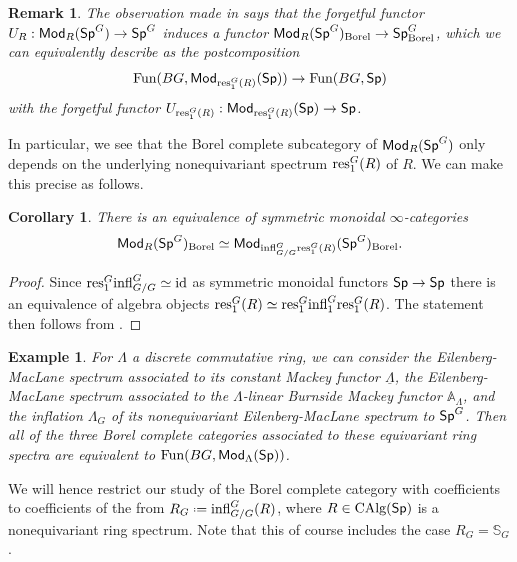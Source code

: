 \documentclass[reqno]{amsart}
\numberwithin{equation}{section}\theoremstyle{thms}
\newtheorem{cor}[equation]{Corollary}
\theoremstyle{defn}
\newtheorem{ex}[equation]{Example}
\newtheorem{rem}[equation]{Remark}
\newcommand{\bA}{\mathbb{A}}
\newcommand{\bS}{\mathbb{S}}
\newcommand{\tn}[1]{\textnormal{#1}}
\newcommand{\tsf}[1]{\textsf{\textup{#1}}}
\newcommand{\underl}[1]{\underline{#1}}
\newcommand*{\defeq}{\mathrel{\vcenter{\baselineskip0.4ex \lineskiplimit0pt
\hbox{\scriptsize.}\hbox{\scriptsize.}}}%
=}
\newcommand{\fun}{\tn{Fun}}
\newcommand{\calg}{\tn{CAlg}}
\newcommand{\Mod}{\tsf{Mod}}
\newcommand{\spec}{\tsf{Sp}}
\newcommand{\specg}{\tsf{Sp}^G}
\begin{document}
\begin{rem}\label{rem:forgetfulonborelcompletes}
The observation made in  says that the forgetful functor $U_R: \Mod_R(\specg) \to \specg$ induces a functor $\Mod_R(\specg)_{\tn{Borel}} \to \specg_{\tn{Borel}}$, which we can equivalently describe as the postcomposition
$$\fun(BG,\Mod_{\tn{res}^G_1(R)}(\spec)) \to \fun(BG,\spec)$$
with the forgetful functor $U_{\tn{res}^G_1(R)}: \Mod_{\tn{res}^G_1(R)}(\spec) \to \spec$.
\end{rem}

In particular, we see that the Borel complete subcategory of $\Mod_R(\specg)$ only depends on the underlying nonequivariant spectrum $\tn{res}^G_1(R)$ of $R$. We can make this precise as follows.

\begin{cor}\label{cor:justrestriction}
There is an equivalence of symmetric monoidal $\infty$-categories
$$\Mod_R(\specg)_{\tn{Borel}} \simeq \Mod_{\tn{infl}^G_{G/G}\tn{res}^G_1(R)}(\specg)_{\tn{Borel}}.$$
\end{cor}
\begin{proof}
Since $\tn{res}^G_1\tn{infl}^G_{G/G} \simeq \tn{id}$ as symmetric monoidal functors $\spec \to \spec$ there is an equivalence of algebra objects $\tn{res}^G_1(R) \simeq \tn{res}^G_1\tn{infl}^G_1\tn{res}^G_1(R)$. The statement then follows from .
\end{proof}

\begin{ex}\label{ex:manylambdas}
For $\Lambda$ a discrete commutative ring, we can consider the Eilenberg-MacLane spectrum associated to its constant Mackey functor $\underl{\Lambda}$, the Eilenberg-MacLane spectrum associated to the $\Lambda$-linear Burnside Mackey functor $\bA_{\Lambda}$, and the inflation $\Lambda_G$ of its nonequivariant Eilenberg-MacLane spectrum to $\specg$. Then all of the three Borel complete categories associated to these equivariant ring spectra are equivalent to $\fun(BG,\Mod_{\Lambda}(\spec))$.
\end{ex}

We will hence restrict our study of the Borel complete category with coefficients to coefficients of the from $R_G \defeq \tn{infl}^G_{G/G}(R)$, where $R \in \calg(\spec)$ is a nonequivariant ring spectrum. Note that this of course includes the case $R_G = \bS_G$.
\end{document}

